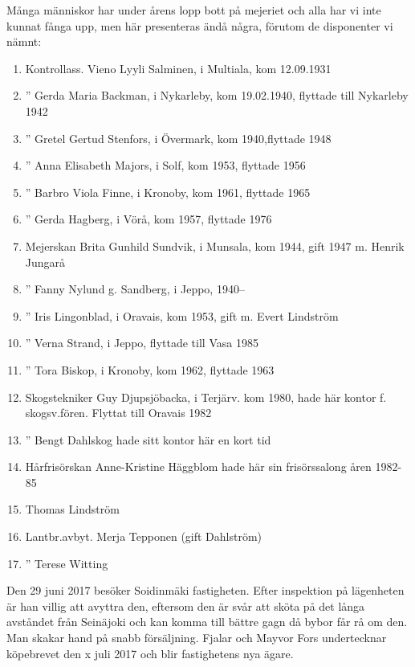 Många människor har under årens lopp  bott på mejeriet och alla har vi inte kunnat fånga upp, men här presenteras ändå några, förutom de disponenter vi nämnt:
\begin{enumerate}
  \item Kontrollass.  Vieno Lyyli Salminen,  i Multiala, kom 12.09.1931
  \item     ''        Gerda Maria Backman,  i Nykarleby, kom 19.02.1940, flyttade till Nykarleby 1942
  \item     ''        Gretel Gertud Stenfors,  i Övermark, kom 1940,flyttade 1948
  \item     ''        Anna Elisabeth Majors,  i Solf, kom 1953, flyttade 1956
  \item     ''        Barbro Viola Finne,  i Kronoby, kom 1961, flyttade 1965
  \item     ''        Gerda Hagberg,  i Vörå, kom 1957, flyttade 1976
  \item Mejerskan     Brita Gunhild Sundvik,  i Munsala, kom 1944, gift 1947 m. Henrik Jungarå
  \item     ''        Fanny Nylund g. Sandberg,  i Jeppo, 1940--
  \item     ''        Iris Lingonblad,  i Oravais, kom 1953, gift m. Evert Lindström
  \item     ''        Verna Strand,   i Jeppo, flyttade till Vasa 1985
  \item     ''        Tora Biskop,   i  Kronoby, kom 1962, flyttade 1963
  \item Skogstekniker Guy Djupsjöbacka,  i Terjärv. kom 1980, hade här kontor f. skogsv.fören. Flyttat till Oravais 1982
  \item     ''        Bengt Dahlskog hade sitt kontor här en kort tid
  \item Hårfrisörskan Anne-Kristine Häggblom hade här sin frisörssalong åren 1982-85
  \item Thomas Lindström
  \item Lantbr.avbyt. Merja Tepponen (gift Dahlström)
  \item     ''        Terese Witting
\end{enumerate}





Den 29 juni 2017 besöker Soidinmäki fastigheten. Efter inspektion på lägenheten är han villig att avyttra den, eftersom den är svår att sköta på det långa avståndet från Seinäjoki och kan komma till bättre gagn då bybor får rå om den. Man skakar hand på snabb försäljning. Fjalar och Mayvor Fors undertecknar köpebrevet den x juli 2017 och blir fastighetens nya ägare.



